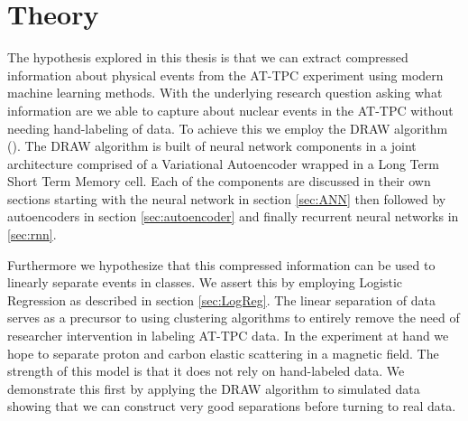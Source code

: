 \chapter{Theory}

The hypothesis explored in this thesis is that we can extract compressed information about physical events from the AT-TPC experiment using modern machine learning methods. With the underlying research question asking what information are we able to capture about nuclear events in the AT-TPC without needing hand-labeling of data. To achieve this we employ the DRAW algorithm (\cite{Gregor2015}). The DRAW algorithm is built of neural network components in a joint architecture comprised of a Variational Autoencoder wrapped in a Long Term Short Term Memory cell. Each  of the components are discussed in their own sections starting with the neural network in  section \ref{sec:ANN} then followed by autoencoders in section \ref{sec:autoencoder} and finally recurrent neural networks in \ref{sec:rnn}. 

\noindent Furthermore we hypothesize that this compressed information can be used to linearly separate events in classes. We assert this by employing Logistic Regression as described in section \ref{sec:LogReg}. The linear separation of data serves as a precursor to using clustering algorithms to entirely remove the need of researcher intervention in labeling AT-TPC data. In the experiment at hand we hope to separate proton and carbon elastic scattering in a magnetic field. The strength of this model is that it does not rely on hand-labeled data. We demonstrate this first by applying the DRAW algorithm to simulated data showing that we can construct very good separations before turning to real data.